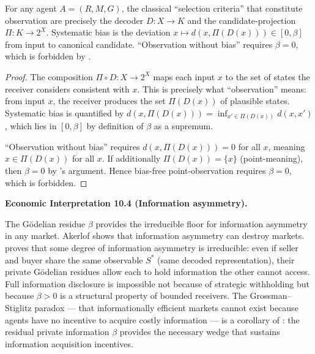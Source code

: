 \documentclass[twocolumn,11pt,a4paper]{article}
\newenvironment{econinterp}[1]{%
  \medskip\noindent\textbf{Economic Interpretation #1.}\normalfont\itshape\space
}{%
  \medskip
}
\begin{document}
\begin{theorem}
\label{thm:biasdecoderobs}
For any agent $A=(R,M,G)$, the classical ``selection criteria'' that
constitute observation are precisely the decoder $D\colon X\to K$ and
the candidate-projection $\Pi\colon K\to 2^X$.  Systematic bias is the
deviation $x\mapsto d(x,\Pi(D(x)))\in[0,\beta]$ from input to canonical
candidate.  ``Observation without bias'' requires $\beta=0$, which is
forbidden by .
\end{theorem}

\begin{proof}
The composition $\Pi\circ D\colon X\to 2^X$ maps each input $x$ to the
set of states the receiver considers consistent with $x$.  This is
precisely what ``observation'' means: from input $x$, the receiver
produces the set $\Pi(D(x))$ of plausible states.  Systematic bias is
quantified by $d(x,\Pi(D(x)))=\inf_{x'\in\Pi(D(x))}d(x,x')$, which
lies in $[0,\beta]$ by definition of $\beta$ as a supremum.

``Observation without bias'' requires $d(x,\Pi(D(x)))=0$ for all $x$,
meaning $x\in\Pi(D(x))$ for all $x$.  If additionally $\Pi(D(x))=\{x\}$
(point-meaning), then $\beta=0$ by 's argument.
Hence bias-free point-observation requires $\beta=0$, which is forbidden.
\end{proof}

\begin{econinterp}{10.4 (Information asymmetry)}
The G\"odelian residue $\beta$ provides the irreducible floor for
information asymmetry in any market.  Akerlof \cite{akerlof1970} shows
that information asymmetry can destroy markets.  
proves that some degree of information asymmetry is irreducible: even if
seller and buyer share the same observable $S^*$ (same decoded
representation), their private G\"odelian residues allow each to hold
information the other cannot access.  Full information disclosure is
impossible not because of strategic withholding but because $\beta>0$ is
a structural property of bounded receivers.  The Grossman--Stiglitz
paradox \cite{grossmanstiglitz1980} — that informationally efficient
markets cannot exist because agents have no incentive to acquire costly
information — is a corollary of : the residual
private information $\beta$ provides the necessary wedge that sustains
information acquisition incentives.
\end{econinterp}
\end{document}
